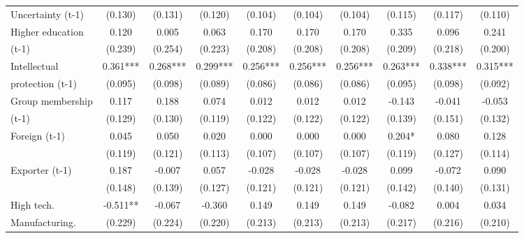 \begin{table}[htbp]
\begin{tabular}{l*{9}{c}}
Uncertainty (t-1)   &     (0.130)   &     (0.131)   &     (0.120)   &     (0.104)   &     (0.104)   &     (0.104)   &     (0.115)   &     (0.117)   &     (0.110)   \\
Higher education    &       0.120   &       0.005   &       0.063   &       0.170   &       0.170   &       0.170   &       0.335   &       0.096   &       0.241   \\
(t-1)               &     (0.239)   &     (0.254)   &     (0.223)   &     (0.208)   &     (0.208)   &     (0.208)   &     (0.209)   &     (0.218)   &     (0.200)   \\
Intellectual        &       0.361***&       0.268***&       0.299***&       0.256***&       0.256***&       0.256***&       0.263***&       0.338***&       0.315***\\
protection (t-1)    &     (0.095)   &     (0.098)   &     (0.089)   &     (0.086)   &     (0.086)   &     (0.086)   &     (0.095)   &     (0.098)   &     (0.092)   \\
Group membership    &       0.117   &       0.188   &       0.074   &       0.012   &       0.012   &       0.012   &      -0.143   &      -0.041   &      -0.053   \\
(t-1)               &     (0.129)   &     (0.130)   &     (0.119)   &     (0.122)   &     (0.122)   &     (0.122)   &     (0.139)   &     (0.151)   &     (0.132)   \\
Foreign (t-1)       &       0.045   &       0.050   &       0.020   &       0.000   &       0.000   &       0.000   &       0.204*  &       0.080   &       0.128   \\
                    &     (0.119)   &     (0.121)   &     (0.113)   &     (0.107)   &     (0.107)   &     (0.107)   &     (0.119)   &     (0.127)   &     (0.114)   \\
Exporter (t-1)      &       0.187   &      -0.007   &       0.057   &      -0.028   &      -0.028   &      -0.028   &       0.099   &      -0.072   &       0.090   \\
                    &     (0.148)   &     (0.139)   &     (0.127)   &     (0.121)   &     (0.121)   &     (0.121)   &     (0.142)   &     (0.140)   &     (0.131)   \\
High tech.          &      -0.511** &      -0.067   &      -0.360   &       0.149   &       0.149   &       0.149   &      -0.082   &       0.004   &       0.034   \\
Manufacturing.      &     (0.229)   &     (0.224)   &     (0.220)   &     (0.213)   &     (0.213)   &     (0.213)   &     (0.217)   &     (0.216)   &     (0.210)   \\

\end{tabular}
\end{table}
